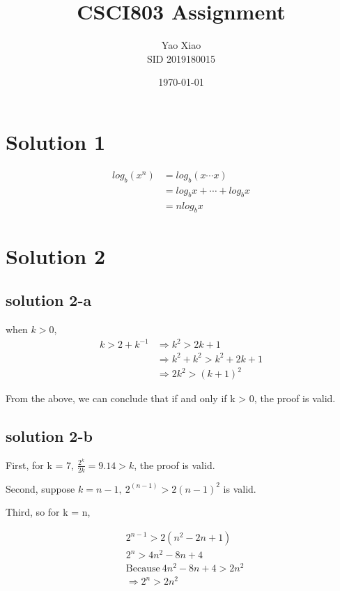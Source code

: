 \documentclass{article}
\title{CSCI803 Assignment}
\author{Yao Xiao \\ SID 2019180015}
\date{\today}
\begin{document}
\maketitle

\section{Solution 1}
\begin{equation}
    \begin{aligned}
        log_b(x^n) &= log_b(x \cdots x)\\
        &= log_bx + \cdots + log_bx\\
        &= nlog_bx
    \end{aligned}
\end{equation}

\section{Solution 2}
\subsection{solution 2-a}
when $k > 0$, 
\begin{equation}
    \begin{aligned}
        k > 2 + k^{-1} &\Rightarrow k^2 > 2k +1\\
        &\Rightarrow k^2 + k^2 > k^2 + 2k + 1\\
        &\Rightarrow 2k^2>(k+1)^2
    \end{aligned}
\end{equation}

From the above, we can conclude that if and only if k > 0, the proof is valid.

\subsection{solution 2-b}
First, for k = 7, $\frac{2^k}{2k}=9.14 > k$, the proof is valid.

Second, suppose $k = n - 1,\ 2^{(n-1)} > 2(n-1)^2$ is valid.

Third, so for k = n,

\begin{equation}
    \begin{aligned}
        &2^{n-1} > 2(n^2-2n+1)\\
        &2^n > 4n^2 -8n + 4\\
        &\mbox{Because} \ 4n^2 -8n+4 > 2n^2\\
        &\Rightarrow 2^n > 2n^2
    \end{aligned}
\end{equation}
\end{document}
